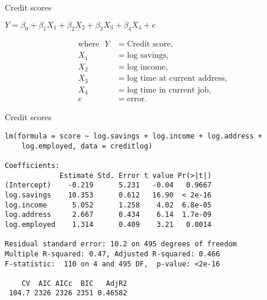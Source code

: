 \documentclass[14pt]{beamer}
\begin{document}
\begin{frame}{Credit scores}

\begin{block}{}
\centerline{$ Y = \beta_0 + \beta_1X_1 + \beta_2X_2 + \beta_3X_3 + \beta_4X_4 + e$}
\end{block}
\begin{align*}
\text{where~~}
Y     &=  \text{Credit score},         \\
X_{1} &=  \text{log savings}, \\
X_{2} &=  \text{log income},      \\
X_{3} &=  \text{log time at current address},\\
X_4     &=  \text{log time in current job},\\
e     &=  \text{error}.
\end{align*}



\end{frame}

\begin{frame}[fragile]{Credit scores}\footnotesize
\begin{verbatim}
lm(formula = score ~ log.savings + log.income + log.address + 
    log.employed, data = creditlog)

Coefficients:
             Estimate Std. Error t value Pr(>|t|)
(Intercept)    -0.219      5.231   -0.04   0.9667
log.savings    10.353      0.612   16.90  < 2e-16
log.income      5.052      1.258    4.02  6.8e-05
log.address     2.667      0.434    6.14  1.7e-09
log.employed    1.314      0.409    3.21   0.0014

Residual standard error: 10.2 on 495 degrees of freedom
Multiple R-squared: 0.47, Adjusted R-squared: 0.466 
F-statistic:  110 on 4 and 495 DF,  p-value: <2e-16 

    CV  AIC AICc  BIC   AdjR2
 104.7 2326 2326 2351 0.46582
\end{verbatim}
\vspace*{10cm}
\end{frame}
\end{document}
